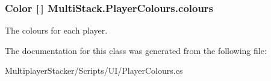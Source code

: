 \subsubsection[{colours}]{\setlength{\rightskip}{0pt plus 5cm}Color \mbox{[}$\,$\mbox{]} Multi\+Stack.\+Player\+Colours.\+colours}\label{class_multi_stack_1_1_player_colours_a3fdd21deb5bab6b7005ed9e72e2053a7}


The colours for each player. 



The documentation for this class was generated from the following file\+:\begin{DoxyCompactItemize}
\item 
Multiplayer\+Stacker/\+Scripts/\+U\+I/Player\+Colours.\+cs\end{DoxyCompactItemize}
